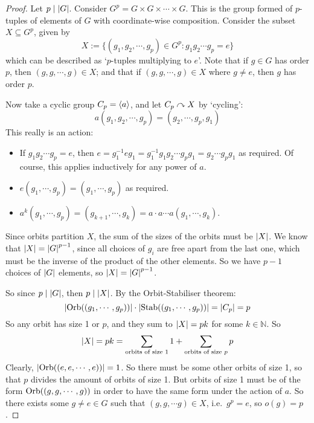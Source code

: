 \begin{proof}
	Let \(p \mid \abs{G}\).
	Consider \(G^p = G \times G \times \cdots \times G\).
	This is the group formed of \(p\)-tuples of elements of \(G\) with coordinate-wise composition.
	Consider the subset \(X \subseteq G^p\), given by
	\[
		X := \{ (g_1, g_2, \cdots, g_p) \in G^p: g_1g_2\cdots g_p = e \}
	\]
	which can be described as `\(p\)-tuples multiplying to \(e\)'.
	Note that if \(g \in G\) has order \(p\), then \((g, g, \cdots, g) \in X\); and that if \((g, g, \cdots, g) \in X\) where \(g \neq e\), then \(g\) has order \(p\).

	Now take a cyclic group \(C_p = \left\langle{} a \right\rangle\), and let \(C_p \curvearrowright X\) by `cycling':
	\[
		a(g_1, g_2, \cdots, g_p) = (g_2, \cdots, g_p, g_1)
	\]
	This really is an action:
	\begin{itemize}
		\item If \(g_1g_2 \cdots g_p = e\), then \(e = g_1^{-1} e g_1 = g_1^{-1}g_1g_2 \cdots g_p g_1 = g_2 \cdots g_p g_1\) as required.
		      Of course, this applies inductively for any power of \(a\).
		\item \(e(g_1, \cdots, g_p) = (g_1, \cdots, g_p)\) as required.
		\item \(a^k(g_1, \cdots, g_p) = (g_{k+1}, \cdots, g_k) = a \cdot a \cdots a(g_1, \cdots, g_k)\).
	\end{itemize}
	Since orbits partition \(X\), the sum of the sizes of the orbits must be \(\abs{X}\).
	We know that \(\abs{X} = \abs{G}^{p-1}\), since all choices of \(g_i\) are free apart from the last one, which must be the inverse of the product of the other elements.
	So we have \(p-1\) choices of \(\abs{G}\) elements, so \(\abs{X} = \abs{G}^{p-1}\).

	So since \(p \mid \abs{G}\), then \(p \mid \abs{X}\).
	By the Orbit-Stabiliser theorem:
	\[
		\abs{\operatorname{Orb}((g_1, \cdots, g_p))} \cdot \abs{\operatorname{Stab}((g_1, \cdots, g_p))} = \abs{C_p} = p
	\]
	So any orbit has size 1 or \(p\), and they sum to \(\abs{X} = pk\) for some \(k \in \mathbb N\).
	So
	\[
		\abs{X} = pk = \sum_{\text{orbits of size 1}} 1 + \sum_{\text{orbits of size \(p\)}} p
	\]
	Clearly, \(\abs{\operatorname{Orb}((e, e, \cdots, e))} = 1\).
	So there must be some other orbits of size 1, so that \(p\) divides the amount of orbits of size 1.
	But orbits of size 1 must be of the form \(\operatorname{Orb}((g, g, \cdots, g))\) in order to have the same form under the action of \(a\).
	So there exists some \(g \neq e \in G\) such that \((g, g, \cdots g) \in X\), i.e.\ \(g^p = e\), so \(o(g) = p\).
\end{proof}

